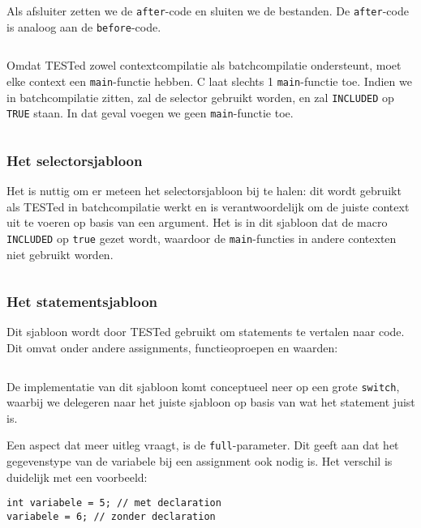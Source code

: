 Als afsluiter zetten we de \texttt{after}-code en sluiten we de bestanden.
De \texttt{after}-code is analoog aan de \texttt{before}-code.

\inputminted[firstline=53,lastline=58]{mako}{sources/c-context.mako}

Omdat TESTed zowel contextcompilatie als batchcompilatie ondersteunt, moet elke context een \texttt{main}-functie hebben.
C laat slechts 1 \texttt{main}-functie toe.
Indien we in batchcompilatie zitten, zal de selector gebruikt worden, en zal \texttt{INCLUDED} op \texttt{TRUE} staan.
In dat geval voegen we geen \texttt{main}-functie toe.

\inputminted[firstline=60,lastline=64]{mako}{sources/c-context.mako}

\subsubsection{Het selectorsjabloon}

Het is nuttig om er meteen het selectorsjabloon bij te halen: dit wordt gebruikt als TESTed in batchcompilatie werkt en is verantwoordelijk om de juiste context uit te voeren op basis van een argument.
Het is in dit sjabloon dat de macro \texttt{INCLUDED} op \texttt{true} gezet wordt, waardoor de \texttt{main}-functies in andere contexten niet gebruikt worden.

\inputminted{mako}{sources/c-selector.mako}

\subsubsection{Het statementsjabloon}

Dit sjabloon wordt door TESTed gebruikt om statements te vertalen naar code.
Dit omvat onder andere assignments, functieoproepen en waarden:

\inputminted{mako}{sources/c-statement.mako}

De implementatie van dit sjabloon komt conceptueel neer op een grote \texttt{switch}, waarbij we delegeren naar het juiste sjabloon op basis van wat het statement juist is.

Een aspect dat meer uitleg vraagt, is de \texttt{full}-parameter.
Dit geeft aan dat het gegevenstype van de variabele bij een assignment ook nodig is.
Het verschil is duidelijk met een voorbeeld:

\begin{verbatim}
int variabele = 5; // met declaration
variabele = 6; // zonder declaration
\end{verbatim}

